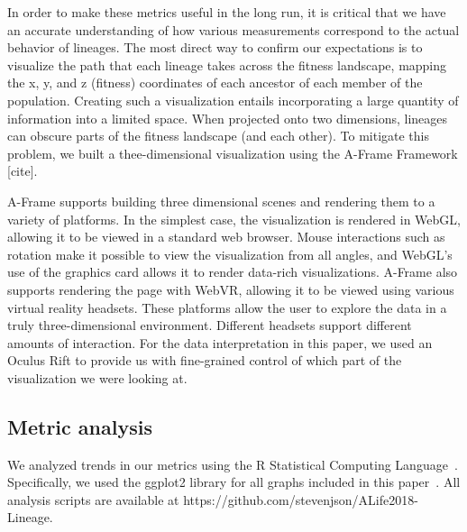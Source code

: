 \documentclass[letterpaper]{article}
\begin{document}
In order to make these metrics useful in the long run, it is critical that we have an accurate understanding of how various measurements correspond to the actual behavior of lineages. The most direct way to confirm our expectations is to visualize the path that each lineage takes across the fitness landscape, mapping the x, y, and z (fitness) coordinates of each ancestor of each member of the population. Creating such a visualization entails incorporating a large quantity of information into a limited space. When projected onto two dimensions, lineages can obscure parts of the fitness landscape (and each other). To mitigate this problem, we built a thee-dimensional visualization using the A-Frame Framework [cite].

A-Frame supports building three dimensional scenes and rendering them to a variety of platforms. In the simplest case, the visualization is rendered in WebGL, allowing it to be viewed in a standard web browser. Mouse interactions such as rotation make it possible to view the visualization from all angles, and WebGL's use of the graphics card allows it to render data-rich visualizations. A-Frame also supports rendering the page with WebVR, allowing it to be viewed using various virtual reality headsets. These platforms allow the user to explore the data in a truly three-dimensional environment. Different headsets support different amounts of interaction. For the data interpretation in this paper, we used an Oculus Rift to provide us with fine-grained control of which part of the visualization we were looking at.

\subsection{Metric analysis}

We analyzed trends in our metrics using the R Statistical Computing Language~\citep{r_core_team_r:_2017}. Specifically, we used the ggplot2 library for all graphs included in this paper~\citep{wickham_ggplot2:_2009}. All analysis scripts are available at https://github.com/stevenjson/ALife2018-Lineage.
\end{document}
